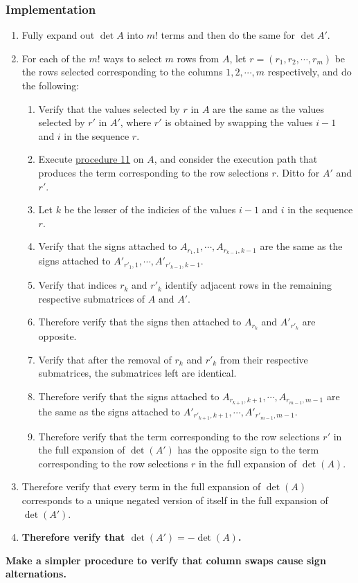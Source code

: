 \documentclass[twocolumn]{article}
\begin{document}
			\subsubsection{Implementation}
				\begin{enumerate}
					\item Fully expand out $\det A$ into $m!$ terms and then do the same for $\det A'$.
					\item For each of the $m!$ ways to select $m$ rows from $A$, let $r=(r_1, r_2, \cdots, r_m)$ be the rows selected corresponding to the columns $1, 2, \cdots, m$ respectively, and do the following:
					\begin{enumerate}
						\item Verify that the values selected by $r$ in $A$ are the same as the values selected by $r'$ in $A'$, where $r'$ is obtained by swapping the values $i-1$ and $i$ in the sequence $r$.
						\item Execute \hyperref[sec:procedure 11]{procedure 11} on $A$, and consider the execution path that produces the term corresponding to the row selections $r$. Ditto for $A'$ and $r'$.
						\item Let $k$ be the lesser of the indicies of the values $i-1$ and $i$ in the sequence $r$.
						\item Verify that the signs attached to $A_{r_1,1},\cdots,A_{r_{k-1},k-1}$ are the same as the signs attached to $A'_{r'_1,1},\cdots,A'_{r'_{k-1},k-1}$.
						\item Verify that indices $r_k$ and $r'_k$ identify adjacent rows in the remaining respective submatrices of $A$ and $A'$.
						\item Therefore verify that the signs then attached to $A_{r_k}$ and $A'_{r'_k}$ are opposite.
						\item Verify that after the removal of $r_k$ and $r'_k$ from their respective submatrices, the submatrices left are identical.
						\item Therefore verify that the signs attached to $A_{r_{k+1},k+1},\cdots,A_{r_{m-1},m-1}$ are the same as the signs attached to $A'_{r'_{k+1},k+1},\cdots,A'_{r'_{m-1},m-1}$.
						\item Therefore verify that the term corresponding to the row selections $r'$ in the full expansion of $\det(A')$ has the opposite sign to the term corresponding to the row selections $r$ in the full expansion of $\det(A)$.
					\end{enumerate}
					\item Therefore verify that every term in the full expansion of $\det(A)$ corresponds to a unique negated version of itself in the full expansion of $\det(A')$.
					\item\textbf{Therefore verify that $\det(A')=-\det(A)$.}
				\end{enumerate}
			\textbf{Make a simpler procedure to verify that column swaps cause sign alternations.}
\end{document}
